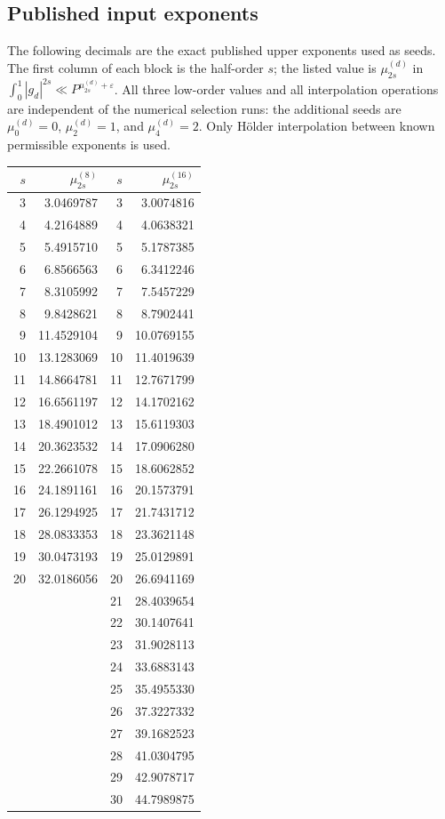 \documentclass[11pt,letterpaper]{article}
\numberwithin{equation}{section}
\begin{document}
\subsection{Published input exponents}
The following decimals are the exact published upper exponents used as seeds.
The first column of each block is the half-order $s$; the listed value is
$\mu_{2s}^{(d)}$ in $\int_0^1|g_d|^{2s}\ll P^{\mu_{2s}^{(d)}+\varepsilon}$.
All three low-order values and all interpolation operations are independent
of the numerical selection runs: the additional seeds are
$\mu_0^{(d)}=0$, $\mu_2^{(d)}=1$, and $\mu_4^{(d)}=2$.
Only H\"older interpolation between known permissible exponents is used.
\begin{center}
\small
\begin{tabular}{rr@{\hspace{2.2cm}}rr}
\toprule
$s$ & $\mu_{2s}^{(8)}$ & $s$ & $\mu_{2s}^{(16)}$\\
\midrule
3 & 3.0469787 & 3 & 3.0074816\\
4 & 4.2164889 & 4 & 4.0638321\\
5 & 5.4915710 & 5 & 5.1787385\\
6 & 6.8566563 & 6 & 6.3412246\\
7 & 8.3105992 & 7 & 7.5457229\\
8 & 9.8428621 & 8 & 8.7902441\\
9 & 11.4529104 & 9 & 10.0769155\\
10 & 13.1283069 & 10 & 11.4019639\\
11 & 14.8664781 & 11 & 12.7671799\\
12 & 16.6561197 & 12 & 14.1702162\\
13 & 18.4901012 & 13 & 15.6119303\\
14 & 20.3623532 & 14 & 17.0906280\\
15 & 22.2661078 & 15 & 18.6062852\\
16 & 24.1891161 & 16 & 20.1573791\\
17 & 26.1294925 & 17 & 21.7431712\\
18 & 28.0833353 & 18 & 23.3621148\\
19 & 30.0473193 & 19 & 25.0129891\\
20 & 32.0186056 & 20 & 26.6941169\\
 &  & 21 & 28.4039654\\
 &  & 22 & 30.1407641\\
 &  & 23 & 31.9028113\\
 &  & 24 & 33.6883143\\
 &  & 25 & 35.4955330\\
 &  & 26 & 37.3227332\\
 &  & 27 & 39.1682523\\
 &  & 28 & 41.0304795\\
 &  & 29 & 42.9078717\\
 &  & 30 & 44.7989875\\
\bottomrule
\end{tabular}
\end{center}
\end{document}
